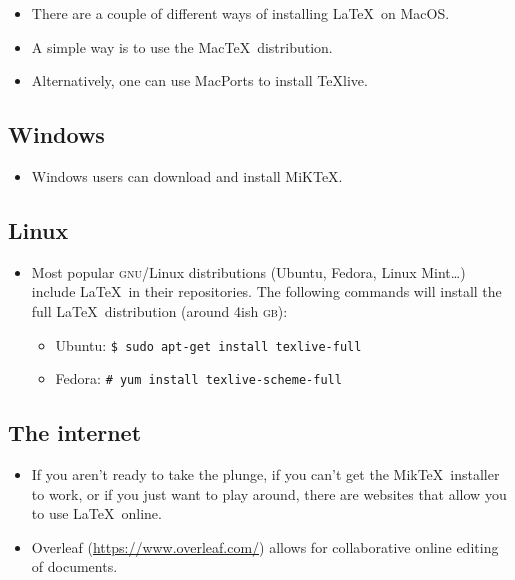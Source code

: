 \documentclass[11pt, letterpaper]{article}
\begin{document}
    \begin{itemize}
      \item There are a couple of different ways of installing \LaTeX\ on MacOS.
      
      \item A simple way is to use the Mac\TeX\ distribution.
      
      \item Alternatively, one can use MacPorts to install \TeX live.
    \end{itemize}


  \subsection{Windows}
  
    \begin{itemize}
	\item Windows users can download and install MiK\TeX.
    \end{itemize}

  \subsection{Linux}
  
    \begin{itemize}
	\item Most popular \textsc{gnu}/Linux distributions (Ubuntu, Fedora, Linux Mint\ldots) include \LaTeX\ in their repositories. The following commands will install the full \LaTeX\ distribution (around 4ish \textsc{gb}):
	
	  \begin{itemize}
	  
	    \item Ubuntu: \verb+$ sudo apt-get install texlive-full+
	    \item Fedora: \verb+# yum install texlive-scheme-full+
	  
	  \end{itemize}
	  
    \end{itemize}
      
  \subsection{The internet}
  
    \begin{itemize}
      \item If you aren't ready to take the plunge, if you can't get the Mik\TeX\ installer to work, or if you just want to play around, there are websites that allow you to use \LaTeX\ online.
      
      \item Overleaf (\url{https://www.overleaf.com/}) allows for collaborative online editing of documents.
    \end{itemize}
\end{document}
